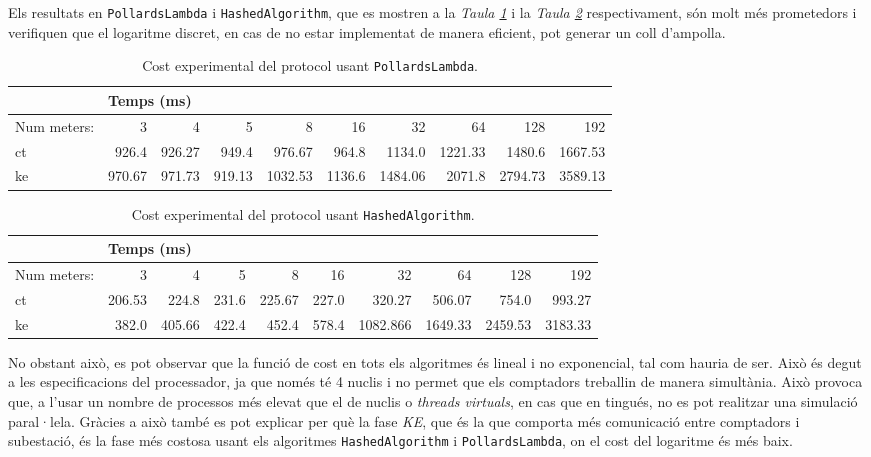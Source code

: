 Els resultats en \texttt{PollardsLambda} i \texttt{HashedAlgorithm}, que es mostren a la \textit{Taula \ref{tab:pollards}} i la \textit{Taula \ref{tab:hashed}} respectivament, són molt més prometedors i verifiquen que el logaritme discret, en cas de no estar implementat de manera eficient, pot generar un coll d'ampolla.

\begin{table}[H]
	\centering
	\begin{tabular}{lrrrrrrrrr}
		\centering
		&\multicolumn{9}{l}{\centering Temps (ms)}\\
		\toprule
		Num meters: &           3  &       4  &           5  &            8  &              16  &         32  &         64  &      128 &     192 \\
		\midrule
		ct &  926.4 &  926.27 &  949.4 &  976.67 &  964.8 &  1134.0 &  1221.33 &  1480.6 &  1667.53 \\
		ke &  970.67 &  971.73&  919.13&  1032.53 &  1136.6 &  1484.06 &  2071.8 &  2794.73 &  3589.13 \\
		\bottomrule
	\end{tabular}
	\caption{Cost experimental del protocol usant \texttt{PollardsLambda}.}
	\label{tab:pollards}
\end{table}
\begin{table}[H]
	\centering
	\begin{tabular}{lrrrrrrrrr}
		\centering
		&\multicolumn{9}{l}{\centering Temps (ms)}\\
		\toprule
		Num meters: &           3  &       4  &           5  &            8  &              16  &         32  &         64  &      128 &     192 \\
		\midrule
		ct &  206.53 &  224.8 &  231.6 &  225.67 &  227.0 &  320.27 &  506.07 &  754.0 &  993.27 \\
		ke &  382.0 &  405.66 &  422.4 &  452.4 &  578.4 &  1082.866 &  1649.33 &  2459.53 &  3183.33 \\
		\bottomrule
	\end{tabular}
	\caption{Cost experimental del protocol usant \texttt{HashedAlgorithm}.}
	\label{tab:hashed}
\end{table}
No obstant això, es pot observar que la funció de cost en tots els algoritmes és lineal i no exponencial, tal com hauria de ser. Això és degut a les especificacions del processador, ja que només té 4 nuclis i no permet que els comptadors treballin de manera simultània. Això provoca que, a l'usar un nombre de processos més elevat que el de nuclis o \textit{threads virtuals}, en cas que en tingués, no es pot realitzar una simulació paral·lela. Gràcies a això també es pot explicar per què la fase \textit{KE}, que és la que comporta més comunicació entre comptadors i subestació, és la fase més costosa usant els algoritmes \texttt{HashedAlgorithm} i \texttt{PollardsLambda}, on el cost del logaritme és més baix.
